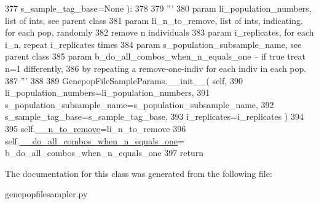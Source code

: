 \begin{DoxyCode}
377             s\_sample\_tag\_base=\textcolor{keywordtype}{None} ):
378 
379         \textcolor{stringliteral}{'''}
380 \textcolor{stringliteral}{        param li\_population\_numbers, list of ints, see parent class}
381 \textcolor{stringliteral}{        param li\_n\_to\_remove, list of ints, indicating, for each pop, randomly }
382 \textcolor{stringliteral}{              remove n individuals}
383 \textcolor{stringliteral}{        param i\_replicates, for each i\_n, repeat i\_replicates times}
384 \textcolor{stringliteral}{        param s\_population\_subsample\_name, see parent class}
385 \textcolor{stringliteral}{        param b\_do\_all\_combos\_when\_n\_equals\_one -- if true treat n=1 differently,}
386 \textcolor{stringliteral}{              by repeating a remove-one-indiv for each indiv in each pop.}
387 \textcolor{stringliteral}{        '''}
388 
389         GenepopFileSampleParams.\_\_init\_\_( self, 
390                     li\_population\_numbers=li\_population\_numbers, 
391                     s\_population\_subsample\_name=s\_population\_subsample\_name,
392                     s\_sample\_tag\_base=s\_sample\_tag\_base,
393                     i\_replicates=i\_replicates )
394 
395         self.\hyperlink{classnegui_1_1genepopfilesampler_1_1GenepopFileSampleParamsRemoval_a23d601163d8118b7af9acf6acf78eecf}{\_\_n\_to\_remove}=li\_n\_to\_remove
396         self.\hyperlink{classnegui_1_1genepopfilesampler_1_1GenepopFileSampleParamsRemoval_a24a47d9cdac499238a1368dcc626e8a3}{\_\_do\_all\_combos\_when\_n\_equals\_one}=
      b\_do\_all\_combos\_when\_n\_equals\_one
397         \textcolor{keywordflow}{return}
\end{DoxyCode}


The documentation for this class was generated from the following file\+:\begin{DoxyCompactItemize}
\item 
genepopfilesampler.\+py\end{DoxyCompactItemize}
